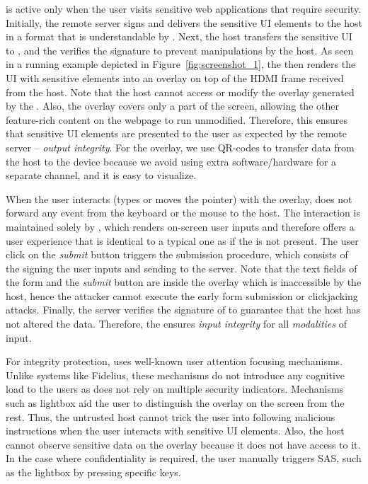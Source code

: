 \device is active only when the user visits sensitive web applications that require \name security.
Initially, the remote server signs and delivers the sensitive UI elements to the host in a format that is understandable by \device. Next, the host transfers the sensitive UI to \device, and the \device verifies the signature to prevent manipulations by the host. As seen in a running example depicted in Figure~\ref{fig:screenshot_1}, the \device then renders the UI with sensitive elements into an overlay on top of the HDMI frame received from the host. Note that the host cannot access or modify the overlay generated by the \device. Also, the overlay covers only a part of the screen, allowing the other feature-rich content on the webpage to run unmodified. Therefore, this ensures that sensitive UI elements are presented to the user as expected by the remote server -- \emph{output integrity}. For the overlay, we use QR-codes to transfer data from the host to the device because we avoid using extra software/hardware for a separate channel, and it is easy to visualize.

When the user interacts (types or moves the pointer) with the overlay, \device does not forward any event from the keyboard or the mouse to the host. The interaction is maintained solely by \device, which renders on-screen user inputs and therefore offers a user experience that is identical to a typical one as if the \device is not present. The user click on the \emph{submit} button triggers the submission procedure, which consists of the \device signing the user inputs and sending to the server. Note that the text fields of the form and the \emph{submit} button are inside the overlay which is inaccessible by the host, hence the attacker cannot execute the early form submission or clickjacking attacks. Finally, the server verifies the signature of \device to guarantee that the host has not altered the data. Therefore, the \device ensures \emph{input integrity} for all \emph{modalities} of input.


For integrity protection, \name uses well-known user attention focusing mechanisms. Unlike systems like Fidelius, these mechanisms do not introduce any cognitive load to the users as \name does not rely on multiple security indicators. Mechanisms such as lightbox aid the user to distinguish the \device overlay on the screen from the rest. Thus, the untrusted host cannot trick the user into following malicious instructions when the user interacts with sensitive UI elements. Also, the host cannot observe sensitive data on the overlay because it does not have access to it. In the case where confidentiality is required, the user manually triggers SAS, such as the lightbox by pressing specific keys.

 

